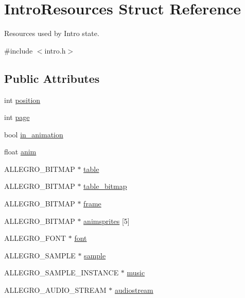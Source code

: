 \hypertarget{structIntroResources}{\section{Intro\+Resources Struct Reference}
\label{structIntroResources}
}


Resources used by Intro state.  




{\ttfamily \#include $<$intro.\+h$>$}

\subsection*{Public Attributes}
\begin{DoxyCompactItemize}
\item 
int \hyperlink{structIntroResources_ad7318e5baf83663178b3a3f71874d304}{position}
\item 
int \hyperlink{structIntroResources_af4fa351c1a12e6932fa3bcfd938e68f4}{page}
\item 
bool \hyperlink{structIntroResources_a31425a1c19b09305c68326521c05eb15}{in\+\_\+animation}
\item 
float \hyperlink{structIntroResources_ab6c183c7319b9b7f4f6b144708d36d62}{anim}
\item 
A\+L\+L\+E\+G\+R\+O\+\_\+\+B\+I\+T\+M\+A\+P $\ast$ \hyperlink{structIntroResources_aafe9aebd6a8e398bd2ff4b05109b280e}{table}
\item 
A\+L\+L\+E\+G\+R\+O\+\_\+\+B\+I\+T\+M\+A\+P $\ast$ \hyperlink{structIntroResources_a4e1e3ab13d0809643cfc394acb2aa301}{table\+\_\+bitmap}
\item 
A\+L\+L\+E\+G\+R\+O\+\_\+\+B\+I\+T\+M\+A\+P $\ast$ \hyperlink{structIntroResources_a3e273e0582d30a5876d0781ac5cbb442}{frame}
\item 
A\+L\+L\+E\+G\+R\+O\+\_\+\+B\+I\+T\+M\+A\+P $\ast$ \hyperlink{structIntroResources_a7dc3ddca5f89f0f1bab100d3c544ebb8}{animsprites} \mbox{[}5\mbox{]}
\item 
A\+L\+L\+E\+G\+R\+O\+\_\+\+F\+O\+N\+T $\ast$ \hyperlink{structIntroResources_ae5a5f94b2f031b3ee9e6aa651e6ee029}{font}
\item 
A\+L\+L\+E\+G\+R\+O\+\_\+\+S\+A\+M\+P\+L\+E $\ast$ \hyperlink{structIntroResources_adaa339b0f793f6c2b9f78fa2d97e1795}{sample}
\item 
A\+L\+L\+E\+G\+R\+O\+\_\+\+S\+A\+M\+P\+L\+E\+\_\+\+I\+N\+S\+T\+A\+N\+C\+E $\ast$ \hyperlink{structIntroResources_ab91be04f8060a65a24eb3e574c577940}{music}
\item 
A\+L\+L\+E\+G\+R\+O\+\_\+\+A\+U\+D\+I\+O\+\_\+\+S\+T\+R\+E\+A\+M $\ast$ \hyperlink{structIntroResources_a4ba25de04dcc54b16335dd0ffe2481f4}{audiostream}
\end{DoxyCompactItemize}


